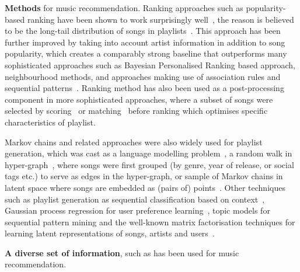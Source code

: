 {\bf Methods} for music recommendation.
Ranking approaches such as popularity-based ranking have been shown to
work surprisingly well~\cite{mcfee2012million,bonnin2013evaluating},
the reason is believed to be the long-tail distribution of songs in 
playlists~\cite{cremonesi2010performance,bonnin2013evaluating}.
%
This approach has been further improved by taking into account artist information in addition to
song popularity, which creates a comparably strong baseline that outperforms many sophisticated 
approaches such as Bayesian Personalised Ranking based approach, neighbourhood methods, and approaches 
making use of association rules and sequential patterns~\cite{mcfee2012million,bonnin2013evaluating}.
%
Ranking method has also been used as a post-processing component in more sophisticated approaches,
where a subset of songs were selected by scoring~\cite{jannach2015beyond} or matching~\cite{hariri2012context}
before ranking which optimises specific characteristics of playlist.


Markov chains and related approaches were also widely used for playlist generation,
which was cast as a language modelling problem~\cite{mcfee2011natural},
a random walk in hyper-graph~\cite{mcfee2012hypergraph}, where songs were first grouped (by genre, 
year of release, or social tags etc.) to serve as edges in the hyper-graph, or sample of Markov chains 
in latent space where songs are embedded as (pairs of) points~\cite{chen2012playlist}.
%
Other techniques such as playlist generation as sequential classification based on context~\cite{ben2017groove},
Gaussian process regression for user preference learning~\cite{platt2002learning},
topic models for sequential pattern mining and the well-known matrix factorisation techniques for learning 
latent representations of songs, artists and users~\cite{mcfee2012hypergraph,chen2012playlist,ben2017groove}.


{\bf A diverse set of information}, such as 
has been used for music recommendation.
